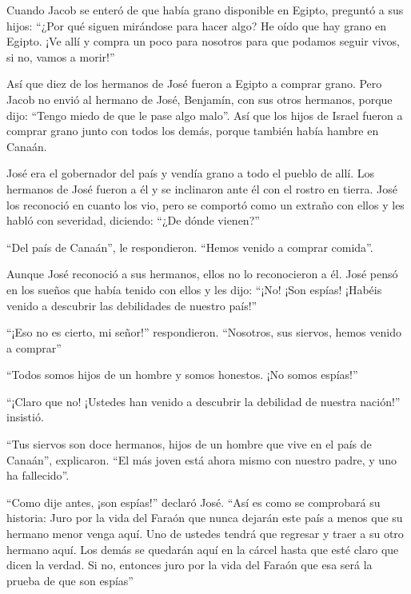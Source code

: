  Cuando Jacob se enteró de que había grano disponible en
Egipto, preguntó a sus hijos: ``¿Por qué siguen mirándose para hacer
algo?  He oído que hay grano en Egipto. ¡Ve allí y compra un
poco para nosotros para que podamos seguir vivos, si no, vamos a
morir!''

 Así que diez de los hermanos de José fueron a Egipto a
comprar grano.  Pero Jacob no envió al hermano de José,
Benjamín, con sus otros hermanos, porque dijo: ``Tengo miedo de que le
pase algo malo''.  Así que los hijos de Israel fueron a
comprar grano junto con todos los demás, porque también había hambre en
Canaán.

 José era el gobernador del país y vendía grano a todo el
pueblo de allí. Los hermanos de José fueron a él y se inclinaron ante él
con el rostro en tierra.  José los reconoció en cuanto los
vio, pero se comportó como un extraño con ellos y les habló con
severidad, diciendo: ``¿De dónde vienen?''

``Del país de Canaán'', le respondieron. ``Hemos venido a comprar
comida''.

 Aunque José reconoció a sus hermanos, ellos no lo
reconocieron a él.  José pensó en los sueños que había
tenido con ellos y les dijo: ``¡No! ¡Son espías! ¡Habéis venido a
descubrir las debilidades de nuestro país!''

 ``¡Eso no es cierto, mi señor!'' respondieron. ``Nosotros,
sus siervos, hemos venido a comprar''

 ``Todos somos hijos de un hombre y somos honestos. ¡No
somos espías!''

 ``¡Claro que no! ¡Ustedes han venido a descubrir la
debilidad de nuestra nación!'' insistió.

 ``Tus siervos son doce hermanos, hijos de un hombre que
vive en el país de Canaán'', explicaron. ``El más joven está ahora mismo
con nuestro padre, y uno ha fallecido''.

 ``Como dije antes, ¡son espías!'' declaró José.
 ``Así es como se comprobará su historia: Juro por la vida
del Faraón que nunca dejarán este país a menos que su hermano menor
venga aquí.  Uno de ustedes tendrá que regresar y traer a
su otro hermano aquí. Los demás se quedarán aquí en la cárcel hasta que
esté claro que dicen la verdad. Si no, entonces juro por la vida del
Faraón que esa será la prueba de que son espías''

